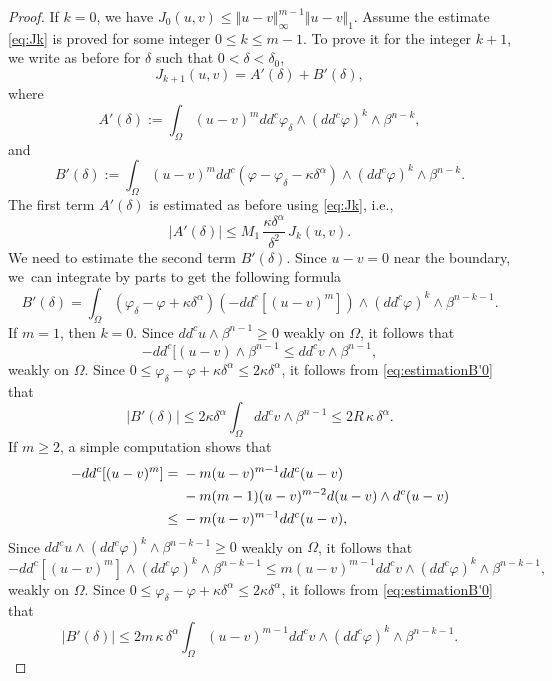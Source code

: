 \documentclass[11pt]{article}
\newcommand{\ie}{i.e.,\xspace}
\numberwithin{equation}{section}
\theoremstyle{definition}
\theoremstyle{plain}
\theoremstyle{definition}
\begin{document}
\begin{proof}
If $k = 0$, we have $J_0 (u,v) \leq \Vert u - v\Vert_{\infty}^{m - 1} \Vert u - v\Vert_1$. Assume the estimate \eqref{eq:Jk} is proved for some integer $0 \leq k \leq m-1$. To prove it for the integer $k + 1$, we write as before for $\delta$ such that $0 < \delta < \delta_0$,
\[
J_{k+1} (u,v) = A' (\delta) + B' (\delta),
\]
where
\[
A' (\delta):=\int_{\Omega}(u-v)^m dd^c \varphi_{\delta}\wedge(dd^c\varphi)^{k} \wedge\beta^{n-k},
\]
and
\[
B' (\delta):= \int_{\Omega}(u-v)^m dd^c(\varphi - \varphi_{\delta} - \kappa \delta^\alpha)\wedge(dd^c\varphi)^{k} \wedge\beta^{n-k}.
\]
The first term $A' (\delta)$ is estimated as before using \eqref{eq:Jk}, \ie
\begin{equation} \label{eq:estimationA'}
|A' (\delta)|\leq M_1 \,\frac{\kappa \delta^{\alpha}}{\delta^2}\, J_k (u,v).
\end{equation}
We need to estimate the second term $B' (\delta)$. Since $ u - v = 0$ near the boundary, we~can integrate by parts to get the following formula
\begin{equation} \label{eq:estimationB'0}
B' (\delta) = \int_{\Omega} (\varphi_{\delta} - \varphi + \kappa \delta^\alpha) \left(- dd^c[ (u-v)^m]\right) \wedge (dd^c\varphi)^k\wedge\beta^{n-k-1}.
\end{equation}
If $m = 1$, then $k = 0$. Since $dd^c u \wedge \beta^{n-1} \geq 0$ weakly on $\Omega$, it follows that
\[
- dd^c [(u-v) \wedge \beta^{n-1} \leq dd^c v \wedge \beta^{n-1},
\]
weakly on $\Omega$.
Since $0 \leq \varphi_{\delta} - \varphi + \kappa \delta^\alpha \leq 2 \kappa \delta^\alpha$, it follows from \eqref{eq:estimationB'0} that
\begin{equation*} \label{eq:estimateB'1}
\vert B' (\delta) \vert \leq 2 \kappa \delta^\alpha \int_\Omega dd^c v \wedge\beta^{n-1} \leq 2 R \, \kappa \, \delta^\alpha.
\end{equation*}
If $ m \geq 2$, a simple computation shows that
\begin{align*}
- dd^c [(u-v)^m] & ={} - m (u-v)^{m -1} dd^c (u - v) \\
&\hphantom{{}={}}- m (m-1) (u-v)^{m - 2} d(u-v) \wedge d^c(u-v) \\
&\leq{}  - m (u-v)^{m -1} dd^c (u- v),
\end{align*}
Since $ dd^c u \wedge (dd^c\varphi)^k\wedge\beta^{n-k-1} \geq 0$ weakly on $\Omega$, it follows that
\[
- dd^c [(u-v)^m] \wedge (dd^c\varphi)^k\wedge\beta^{n-k-1} \leq m (u-v)^{m -1} dd^c v\wedge (dd^c\varphi)^k\wedge\beta^{n-k-1},
\]
weakly on $\Omega$.
Since $0 \leq \varphi_{\delta} - \varphi + \kappa \delta^\alpha \leq 2 \kappa \delta^\alpha$, it follows from \eqref{eq:estimationB'0} that
\begin{equation} \label{eq:estimation2}
|B' (\delta)| \leq 2 m \, \kappa \, \delta^{\alpha} \int_\Omega (u-v)^{m -1} dd^c v \wedge (dd^c\varphi)^k\wedge\beta^{n-k-1}.
\end{equation}


\end{proof}
\end{document}
